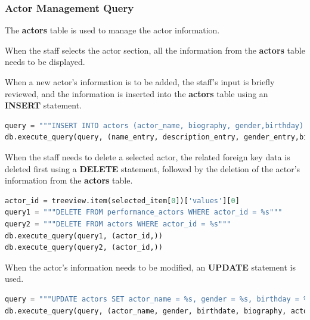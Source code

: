 \documentclass[12pt]{article}
\begin{document}
\subsubsection{Actor Management Query}
\par The \textbf{actors} table is used to manage the actor information.
\par When the staff selects the actor section, all the information from the \textbf{actors} table needs to be displayed.
\par When a new actor's information is to be added, the staff's input is briefly reviewed, and the information is inserted into the \textbf{actors} table using an \textbf{INSERT} statement.
\begin{tcolorbox}[colframe=black, colback=white, boxrule=0.4mm, sharp corners=southwest, title=Excerpt of Actor Add Code]
    \begin{lstlisting}[language=Python, breaklines=true]
query = """INSERT INTO actors (actor_name, biography, gender,birthday) VALUES (%s, %s, %s,%s)"""
db.execute_query(query, (name_entry, description_entry, gender_entry,birthdate_entry))
\end{lstlisting}
\end{tcolorbox}

\par When the staff needs to delete a selected actor, the related foreign key data is deleted first using a \textbf{DELETE} statement, followed by the deletion of the actor's information from the \textbf{actors} table.
\begin{tcolorbox}[colframe=black, colback=white, boxrule=0.4mm, sharp corners=southwest, title=Excerpt of Actor Deletion Code]
    \begin{lstlisting}[language=Python, breaklines=true]
actor_id = treeview.item(selected_item[0])['values'][0]  
query1 = """DELETE FROM performance_actors WHERE actor_id = %s"""
query2 = """DELETE FROM actors WHERE actor_id = %s"""
db.execute_query(query1, (actor_id,))
db.execute_query(query2, (actor_id,))
\end{lstlisting}
\end{tcolorbox}

\par When the actor's information needs to be modified, an \textbf{UPDATE} statement is used.
\begin{tcolorbox}[colframe=black, colback=white, boxrule=0.4mm, sharp corners=southwest, title=Excerpt of Actor Edit Code]
    \begin{lstlisting}[language=Python, breaklines=true]
query = """UPDATE actors SET actor_name = %s, gender = %s, birthday = %s, biography = %s WHERE actor_id = %s"""
db.execute_query(query, (actor_name, gender, birthdate, biography, actor_id))
\end{lstlisting}
\end{tcolorbox}
\end{document}
